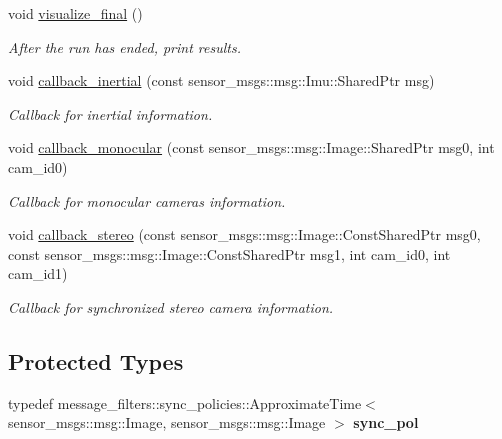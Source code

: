 \begin{DoxyCompactItemize}
void \hyperlink{classov__msckf_1_1ROS2Visualizer_a9126120133a9b4e329c55f0b84c6cf37}{visualize\+\_\+final} ()
\begin{DoxyCompactList}\small\item\em After the run has ended, print results. \end{DoxyCompactList}\item 
\mbox{\label{classov__msckf_1_1ROS2Visualizer_afd07ffaa161451684954a6b890de9848}} 
void \hyperlink{classov__msckf_1_1ROS2Visualizer_afd07ffaa161451684954a6b890de9848}{callback\+\_\+inertial} (const sensor\+\_\+msgs\+::msg\+::\+Imu\+::\+Shared\+Ptr msg)
\begin{DoxyCompactList}\small\item\em Callback for inertial information. \end{DoxyCompactList}\item 
\mbox{\label{classov__msckf_1_1ROS2Visualizer_a22f4ec95cccb5a98bc9b5c196d3c29cb}} 
void \hyperlink{classov__msckf_1_1ROS2Visualizer_a22f4ec95cccb5a98bc9b5c196d3c29cb}{callback\+\_\+monocular} (const sensor\+\_\+msgs\+::msg\+::\+Image\+::\+Shared\+Ptr msg0, int cam\+\_\+id0)
\begin{DoxyCompactList}\small\item\em Callback for monocular cameras information. \end{DoxyCompactList}\item 
\mbox{\label{classov__msckf_1_1ROS2Visualizer_a03578b71069992491971ef4e5c5f3c1d}} 
void \hyperlink{classov__msckf_1_1ROS2Visualizer_a03578b71069992491971ef4e5c5f3c1d}{callback\+\_\+stereo} (const sensor\+\_\+msgs\+::msg\+::\+Image\+::\+Const\+Shared\+Ptr msg0, const sensor\+\_\+msgs\+::msg\+::\+Image\+::\+Const\+Shared\+Ptr msg1, int cam\+\_\+id0, int cam\+\_\+id1)
\begin{DoxyCompactList}\small\item\em Callback for synchronized stereo camera information. \end{DoxyCompactList}\end{DoxyCompactItemize}
\subsection*{Protected Types}
\begin{DoxyCompactItemize}
\item 
\mbox{\label{classov__msckf_1_1ROS2Visualizer_a5151d8bae1c37c9665f9758014c2ffb7}} 
typedef message\+\_\+filters\+::sync\+\_\+policies\+::\+Approximate\+Time$<$ sensor\+\_\+msgs\+::msg\+::\+Image, sensor\+\_\+msgs\+::msg\+::\+Image $>$ {\bfseries sync\+\_\+pol}
\end{DoxyCompactItemize}
